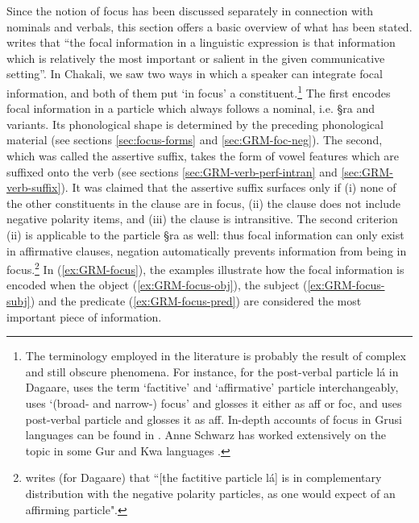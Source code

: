 Since the notion of focus has been discussed separately in connection with
nominals and verbals, this section offers a basic overview of what has been
stated.  \citet[326]{Dik97} writes that   ``the focal information in a
linguistic expression is
that
information which is relatively the most important or salient in the given
communicative setting''.  In Chakali, we saw  two ways in which a
speaker can integrate focal information, and both of them put `in focus' a
constituent.\footnote{The  terminology employed in the literature is probably
the result
of  complex and still obscure phenomena. For instance, for the
post-verbal particle {\F lá} in Dagaare, \cite{Bodo97} uses the term
`factitive' and `affirmative' particle interchangeably, \cite{Daku05} uses
`(broad- and narrow-)  focus' and glosses it either as {\sc aff} or {\sc foc},
and
\cite{Saan03} uses post-verbal particle and glosses it as {\sc aff}. In-depth
accounts of focus in Grusi languages can be found in \cite{Blas90, Mcgi99}.
 Anne Schwarz has worked extensively on the topic in some Gur and Kwa
languages \citep{Schw10}.}   The first
encodes focal information in a particle which  always
 follows a nominal, i.e. {\S ra} and variants. Its  phonological shape is
determined by the
preceding phonological material (see sections \ref{sec:focus-forms} and 
\ref{sec:GRM-foc-neg}). The second, which was called the assertive suffix, takes
the form of vowel features which
are suffixed onto the verb  (see sections \ref{sec:GRM-verb-perf-intran} and 
\ref{sec:GRM-verb-suffix}). It was claimed that  the assertive suffix surfaces
only if (i) none of the other constituents in the
clause are in focus, (ii) the clause does not include negative polarity items,
and (iii) the clause is intransitive.
The second criterion (ii) is applicable to the particle {\S ra} as well: thus
focal
information can only exist in affirmative clauses, negation automatically
prevents information from being in focus.\footnote{\citet[94]{Bodo97} writes
(for
Dagaare) that
``[the factitive particle {\F lá}] is in complementary distribution with the
negative polarity particles, as one would expect of an affirming particle".}  In
 (\ref{ex:GRM-focus}),  the
examples illustrate  how the  focal information is
encoded when the object (\ref{ex:GRM-focus-obj}), the subject
(\ref{ex:GRM-focus-subj}) and the predicate  (\ref{ex:GRM-focus-pred}) are
considered the most important piece of information. 


